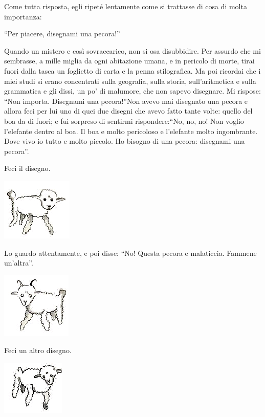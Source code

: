 \documentclass[11pt]{scrbook}
\begin{document}
Come tutta risposta, egli ripeté lentamente come si trattasse di cosa di
molta importanza:

``Per piacere, disegnami una pecora!''

Quando un mistero e così sovraccarico, non si osa disubbidire. Per
assurdo che mi sembrasse, a mille miglia da ogni abitazione umana, e in
pericolo di morte, tirai fuori dalla tasca un foglietto di carta e la
penna stilografica. Ma poi ricordai che i miei studi si erano
concentrati sulla geografia, sulla storia, sull'aritmetica e sulla
grammatica e gli dissi, un po' di malumore, che non sapevo disegnare. Mi
rispose: ``Non importa. Disegnami una pecora!''Non avevo mai disegnato
una pecora e allora feci per lui uno di quei due disegni che avevo fatto
tante volte: quello del boa da di fuori; e fui sorpreso di sentirmi
rispondere:``No, no, no! Non voglio l'elefante dentro al boa. Il boa e
molto pericoloso e l'elefante molto ingombrante. Dove vivo io tutto e
molto piccolo. Ho bisogno di una pecora: disegnami una pecora''.

Feci il disegno.

\begin{center}
\includegraphics{./img/2b.png}
\end{center}

Lo guardo attentamente, e poi disse: ``No! Questa pecora e malaticcia.
Fammene un'altra''.

\begin{center}
\includegraphics{./img/2c.png}
\end{center}

Feci un altro disegno.

\begin{center}
\includegraphics{./img/2d.png}
\end{center}
\end{document}
